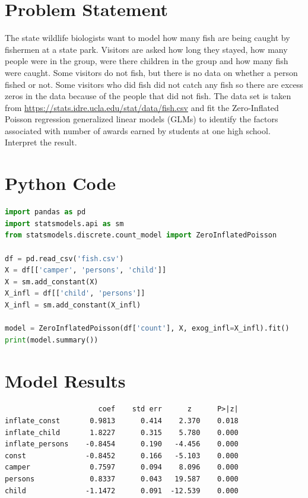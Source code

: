 \documentclass[12pt, a4paper]{article}
\begin{document}
\section{Problem Statement}The state wildlife biologists want to model how many fish are being caught by fishermen at a state park. Visitors are asked how long they stayed, how many people were in the group, were there children in the group and how many fish were caught. Some visitors do not fish, but there is no data on whether a person fished or not. Some visitors who did fish did not catch any fish so there are excess zeros in the data because of the people that did not fish. The data set is taken from \url{https://stats.idre.ucla.edu/stat/data/fish.csv} and fit the Zero-Inflated Poisson regression generalized linear models (GLMs) to identify the factors associated with number of awards earned by students at one high school. Interpret the result.
\section*{Python Code}
\begin{lstlisting}[language=Python]
import pandas as pd
import statsmodels.api as sm
from statsmodels.discrete.count_model import ZeroInflatedPoisson

df = pd.read_csv('fish.csv')
X = df[['camper', 'persons', 'child']]
X = sm.add_constant(X)
X_infl = df[['child', 'persons']]
X_infl = sm.add_constant(X_infl)

model = ZeroInflatedPoisson(df['count'], X, exog_infl=X_infl).fit()
print(model.summary())
\end{lstlisting}

\section*{Model Results}
\begin{outputbox}
\begin{verbatim}
                      coef    std err      z      P>|z|
inflate_const       0.9813      0.414    2.370    0.018
inflate_child       1.8227      0.315    5.780    0.000
inflate_persons    -0.8454      0.190   -4.456    0.000
const              -0.8452      0.166   -5.103    0.000
camper              0.7597      0.094    8.096    0.000
persons             0.8337      0.043   19.587    0.000
child              -1.1472      0.091  -12.539    0.000
\end{verbatim}
\end{outputbox}
\end{document}
